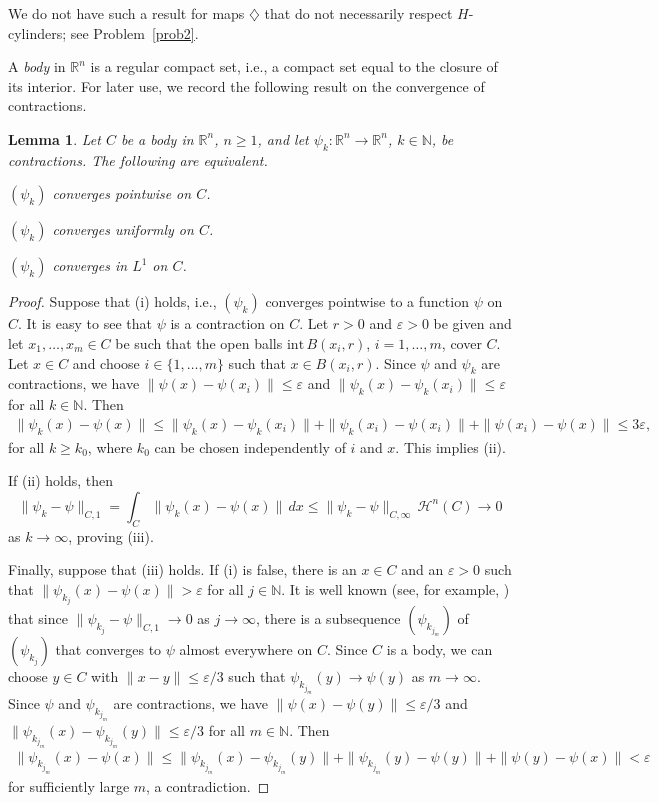 \documentclass[12pt,reqno]{amsart}
\newcommand{\ee}{\varepsilon}
\newcommand{\N}{{\mathbb N}}
\newcommand{\R}{{\mathbb R}}
\newcommand{\cH}{{\mathcal H}}
\newtheorem{lem}[thm]{Lemma}
\newcommand{\inte}{{\mathrm{int}}\,}
\newcommand{\di}{\diamondsuit}
\numberwithin{equation}{section}
\begin{document}
We do not have such a result for maps $\di$ that do not necessarily respect $H$-cylinders; see Problem~\ref{prob2}.

A {\em body} in $\R^n$ is a regular compact set, i.e., a compact set equal to the closure of its interior.  For later use, we record the following result on the convergence of contractions.

\begin{lem}\label{lem11824}
Let $C$ be a body in $\R^n$, $n\ge 1$, and let $\psi_k:\R^n\to \R^n$, $k\in \N$, be contractions. The following are equivalent.

 $(\psi_k)$ converges pointwise on $C$.

 $(\psi_k)$ converges uniformly on $C$.

 $(\psi_k)$ converges in $L^1$ on $C$.
\end{lem}

\begin{proof}
Suppose that (i) holds, i.e., $(\psi_k)$ converges pointwise to a function $\psi$ on $C$. It is easy to see that $\psi$ is a contraction on $C$.  Let $r>0$ and $\varepsilon>0$ be given and let $x_1,\ldots,x_m\in C$ be such that the open balls $\inte B(x_i,r)$, $i=1,\dots,m$, cover $C$. Let $x\in C$ and choose $i\in \{1,\dots,m\}$ such that $x\in B(x_i,r)$.  Since $\psi$ and $\psi_{k}$ are contractions, we have $\|\psi(x)-\psi(x_i)\|\le\ee$ and $\|\psi_{k}(x)-\psi_{k}(x_i)\|\le\ee$ for all $k\in \N$. Then
\begin{align*}
\|\psi_k(x)-\psi(x)\|\le \|\psi_k(x)-\psi_k(x_i)\|+\|\psi_k(x_i)-\psi(x_i)\|+\|\psi(x_i)-\psi(x)\|\le 3 \varepsilon,
\end{align*}
for all $k\ge k_0$, where $k_0$ can be chosen independently of $i$ and $x$. This implies (ii).

If (ii) holds, then
$$\|\psi_k-\psi\|_{C,1}=\int_C\|\psi_k(x)-\psi(x)\|\,dx\le \|\psi_k-\psi\|_{C,\infty}\,{\cH}^n(C)\to 0$$
as $k\to\infty$, proving (iii).

Finally, suppose that (iii) holds.  If (i) is false, there is an $x\in C$ and an $\varepsilon>0$ such that $\|\psi_{k_j}(x)-\psi(x)\|>\ee$ for all $j\in \N$.  It is well known (see, for example, \cite[Theorem~2.7]{LL}) that since $\|\psi_{k_j}-\psi\|_{C,1}\to 0$ as $j\to \infty$, there is a subsequence $(\psi_{k_{j_m}})$ of $(\psi_{k_{j}})$ that converges to $\psi$ almost everywhere on $C$.  Since $C$ is a body, we can choose $y\in C$ with $\|x-y\|\le \ee/3$ such that $\psi_{k_{j_m}}(y)\to \psi(y)$ as $m\to\infty$.  Since $\psi$ and $\psi_{k_{j_m}}$ are contractions, we have $\|\psi(x)-\psi(y)\|\le\ee/3$ and $\|\psi_{k_{j_m}}(x)-\psi_{k_{j_m}}(y)\|\le\ee/3$ for all $m\in \N$.  Then
\begin{align*}
\|\psi_{k_{j_m}}(x)-\psi(x)\|\le \|\psi_{k_{j_m}}(x)-\psi_{k_{j_m}}(y)\|+\|\psi_{k_{j_m}}(y)-\psi(y)\|+
\|\psi(y)-\psi(x)\|<\ee
\end{align*}
for sufficiently large $m$, a contradiction.
\end{proof}
\end{document}
